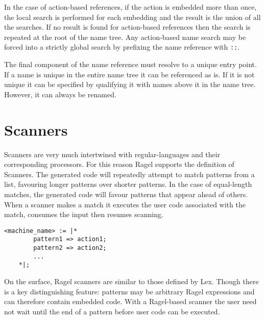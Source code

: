 \documentclass[letterpaper,11pt,oneside]{book}
\newcommand{\verbspace}{\vspace{10pt}}
\begin{document}
In the case of action-based references, if the action is embedded more than
once, the local search is performed for each embedding and the result is the
union of all the searches. If no result is found for action-based references then
the search is repeated at the root of the name tree.  Any action-based name
search may be forced into a strictly global search by prefixing the name
reference with \verb|::|.

The final component of the name reference must resolve to a unique entry point.
If a name is unique in the entire name tree it can be referenced as is. If it
is not unique it can be specified by qualifying it with names above it in the
name tree. However, it can always be renamed.



\section{Scanners}
\label{generating-scanners}

Scanners are very much intertwined with regular-languages and their
corresponding processors. For this reason Ragel supports the definition of
Scanners.  The generated code will repeatedly attempt to match patterns from a
list, favouring longer patterns over shorter patterns.  In the case of
equal-length matches, the generated code will favour patterns that appear ahead
of others. When a scanner makes a match it executes the user code associated
with the match, consumes the input then resumes scanning.

\verbspace
\begin{verbatim}
<machine_name> := |* 
        pattern1 => action1;
        pattern2 => action2;
        ...
    *|;
\end{verbatim}
\verbspace

On the surface, Ragel scanners are similar to those defined by Lex. Though
there is a key distinguishing feature: patterns may be arbitrary Ragel
expressions and can therefore contain embedded code. With a Ragel-based scanner
the user need not wait until the end of a pattern before user code can be
executed.
\end{document}
